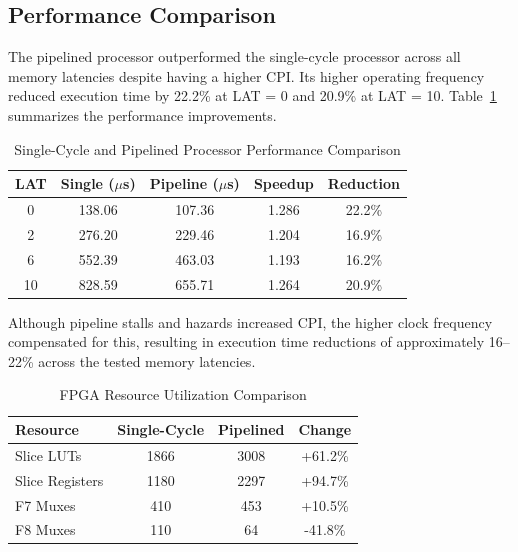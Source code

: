 \documentclass[12pt]{article}
\begin{document}
\subsection{Performance Comparison}

The pipelined processor outperformed the single-cycle processor across all memory latencies despite having a higher CPI. Its higher operating frequency reduced execution time by 22.2\% at LAT = 0 and 20.9\% at LAT = 10. Table~\ref{tb:performance_comparison} summarizes the performance improvements.

\begin{table}[H]
    \centering
    \small
    \begin{tabular}{|c|c|c|c|c|}
        \hline
        \textbf{LAT} &
        \textbf{Single ($\mu$s)} &
        \textbf{Pipeline ($\mu$s)} &
        \textbf{Speedup} &
        \textbf{Reduction} \\ \hline
        0 & 138.06 & 107.36 & 1.286 & 22.2\% \\ \hline
        2 & 276.20 & 229.46 & 1.204 & 16.9\% \\ \hline
        6 & 552.39 & 463.03 & 1.193 & 16.2\% \\ \hline
        10 & 828.59 & 655.71 & 1.264 & 20.9\% \\ \hline
    \end{tabular}
    \caption{Single-Cycle and Pipelined Processor Performance Comparison}
    \label{tb:performance_comparison}
\end{table}

Although pipeline stalls and hazards increased CPI, the higher clock frequency compensated for this, resulting in execution time reductions of approximately 16--22\% across the tested memory latencies.

\begin{table}[H]
    \centering
    \small
    \begin{tabular}{|l|c|c|c|}
        \hline
        \textbf{Resource} &
        \textbf{Single-Cycle} &
        \textbf{Pipelined} &
        \textbf{Change} \\ \hline
        Slice LUTs & 1866 & 3008 & +61.2\% \\ \hline
        Slice Registers & 1180 & 2297 & +94.7\% \\ \hline
        F7 Muxes & 410 & 453 & +10.5\% \\ \hline
        F8 Muxes & 110 & 64 & -41.8\% \\ \hline
    \end{tabular}
    \caption{FPGA Resource Utilization Comparison}
    \label{tb:resource_comparison}
\end{table}
\end{document}
